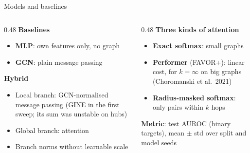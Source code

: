 \documentclass[aspectratio=169,10pt]{beamer}
\newcommand{\snote}[1]{{\scriptsize\textcolor{ink!70}{#1}}}
\begin{document}
\begin{frame}{Models and baselines}
  \begin{columns}[T]
    \begin{column}{0.48\textwidth}
      \textbf{Baselines}
      \begin{itemize}\small
        \item \textbf{MLP}: own features only, no graph
        \item \textbf{GCN}: plain message passing
      \end{itemize}
      \vspace{0.3em}
      \textbf{Hybrid}
      \begin{itemize}\small
        \item Local branch: GCN-normalised message passing \snote{(GINE in the first sweep; its sum was unstable on hubs)}
        \item Global branch: attention
        \item Branch norms without learnable scale
      \end{itemize}
    \end{column}
    \begin{column}{0.48\textwidth}
      \textbf{Three kinds of attention}
      \begin{itemize}\small
        \item \textbf{Exact softmax}: small graphs
        \item \textbf{Performer} (FAVOR+): linear cost, for $k=\infty$ on big graphs \snote{(Choromanski et al.\ 2021)}
        \item \textbf{Radius-masked softmax}: only pairs within $k$ hops
      \end{itemize}
      \vspace{0.3em}
      \textbf{Metric}: test AUROC (binary targets), mean $\pm$ std over split and model seeds
    \end{column}
  \end{columns}
\end{frame}
\end{document}
